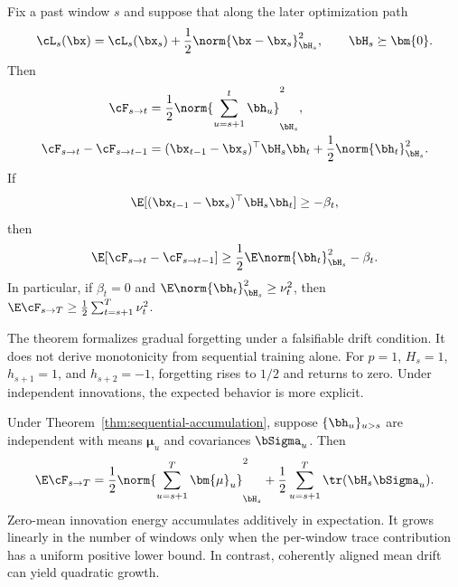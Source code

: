 \begin{theorem}
\label{thm:sequential-accumulation}
Fix a past window $s$ and suppose that along the later optimization path
\begin{equation}
  \cL_s(\bx)=\cL_s(\bx_s)
  +\frac12\norm{\bx-\bx_s}_{\bH_s}^2,
  \qquad \bH_s\succeq\bm{0}.
  \label{eq:quadratic-old-loss}
\end{equation}
Then
\begin{align}
  \cF_{s\to t}
  &=\frac12\norm{\sum_{u=s+1}^{t}\bh_u}_{\bH_s}^2,
  \label{eq:path-forgetting}\\
  \cF_{s\to t}-\cF_{s\to t-1}
  &=(\bx_{t-1}-\bx_s)^\top\bH_s\bh_t
  +\frac12\norm{\bh_t}_{\bH_s}^2.
  \label{eq:forgetting-increment}
\end{align}
If
\begin{equation}
  \E[(\bx_{t-1}-\bx_s)^\top\bH_s\bh_t]\geq-\beta_t,
  \label{eq:noncancellation}
\end{equation}
then
\begin{equation}
  \E[\cF_{s\to t}-\cF_{s\to t-1}]
  \geq\frac12\E\norm{\bh_t}_{\bH_s}^2-\beta_t.
  \label{eq:expected-increment}
\end{equation}
In particular, if $\beta_t=0$ and
$\E\norm{\bh_t}_{\bH_s}^2\geq\nu_t^2$, then
$\E\cF_{s\to T}\geq\frac12\sum_{t=s+1}^{T}\nu_t^2$.
\end{theorem}

The theorem formalizes gradual forgetting under a falsifiable drift condition.
It does not derive monotonicity from sequential training alone. For $p=1$,
$H_s=1$, $h_{s+1}=1$, and $h_{s+2}=-1$, forgetting rises to $1/2$ and returns
to zero. Under independent innovations, the expected behavior is more explicit.

\begin{corollary}
\label{cor:independent-innovations}
Under Theorem~\ref{thm:sequential-accumulation}, suppose
$\{\bh_u\}_{u>s}$ are independent with means $\bm{\mu}_u$ and covariances
$\bSigma_u$. Then
\begin{equation}
  \E\cF_{s\to T}
  =\frac12\norm{\sum_{u=s+1}^{T}\bm{\mu}_u}_{\bH_s}^2
  +\frac12\sum_{u=s+1}^{T}\tr(\bH_s\bSigma_u).
  \label{eq:innovation-accumulation}
\end{equation}
Zero-mean innovation energy accumulates additively in expectation. It grows
linearly in the number of windows only when the per-window trace contribution
has a uniform positive lower bound. In contrast,
coherently aligned mean drift can yield quadratic growth.
\end{corollary}

